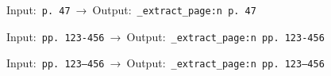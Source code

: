 \documentclass{article}
\newcommand{\testpage}[1]{%
  \ExplSyntaxOn
  Input:~\texttt{#1}~→~Output:~\texttt{\gb_extract_page:n {#1}}
  \ExplSyntaxOff
}
\begin{document}
\testpage{p.~47}

\testpage{pp.~123-456}

\testpage{pp.~123--456}
\end{document}
